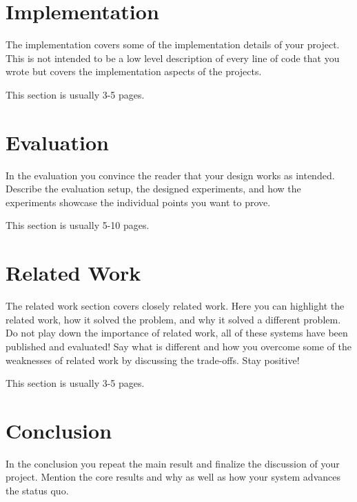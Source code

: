 \documentclass[a4paper,11pt,oneside]{report}
\begin{document}
\chapter{Implementation}

The implementation covers some of the implementation details of your project.
This is not intended to be a low level description of every line of code that
you wrote but covers the implementation aspects of the projects.

This section is usually 3-5 pages.


\chapter{Evaluation}

In the evaluation you convince the reader that your design works as intended.
Describe the evaluation setup, the designed experiments, and how the
experiments showcase the individual points you want to prove.

This section is usually 5-10 pages.


\chapter{Related Work}

The related work section covers closely related work. Here you can highlight
the related work, how it solved the problem, and why it solved a different
problem.  Do not play down the importance of related work, all of these systems
have been published and evaluated! Say what is different and how you overcome
some of the weaknesses of related work by discussing the trade-offs. Stay
positive!

This section is usually 3-5 pages.


\chapter{Conclusion}

In the conclusion you repeat the main result and finalize the discussion of
your project. Mention the core results and why as well as how your system
advances the status quo.

\cleardoublepage {} {}
\printbibliography

%
%
\end{document}
